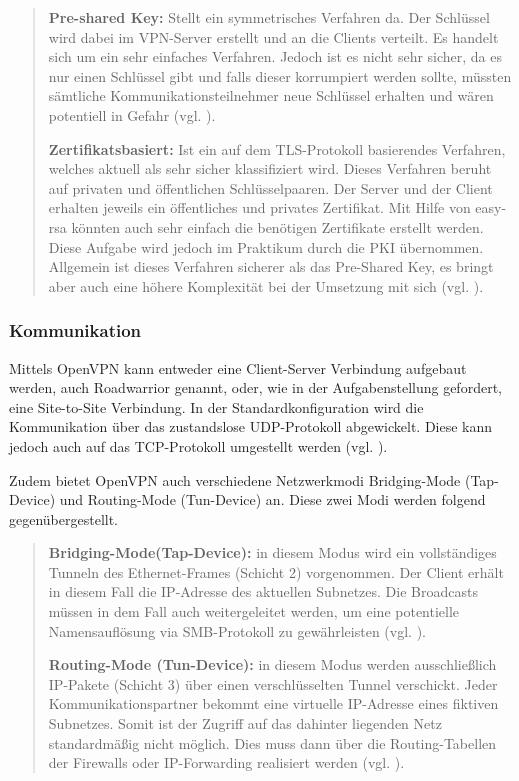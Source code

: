 \documentclass[
a4paper,     %
 headsepline, %
footsepline, %
titlepage,   %
 halfparskip,     %
 fleqn,       %
12pt         %
]{scrartcl}  %
\begin{document}
\begin{quotation}
\item[\textbf{Pre-shared Key:}]
Stellt ein symmetrisches Verfahren da. Der Schlüssel wird dabei im VPN-Server erstellt und an die Clients verteilt. Es handelt sich um ein sehr einfaches Verfahren. Jedoch ist es nicht sehr sicher, da es nur einen Schlüssel gibt und falls dieser korrumpiert werden sollte, müssten sämtliche Kommunikationsteilnehmer neue Schlüssel erhalten und wären potentiell in Gefahr (vgl. \cite{openV-1}). 

\item[\textbf{Zertifikatsbasiert:}]
Ist ein auf dem TLS-Protokoll basierendes Verfahren, welches aktuell als sehr sicher klassifiziert wird. Dieses Verfahren beruht auf privaten und öffentlichen Schlüsselpaaren. Der Server und der Client erhalten jeweils ein öffentliches und privates Zertifikat. Mit Hilfe von easy-rsa könnten auch sehr einfach die benötigen Zertifikate erstellt werden. Diese Aufgabe wird jedoch im Praktikum durch die PKI übernommen. Allgemein ist dieses Verfahren sicherer als das Pre-Shared Key, es bringt aber auch eine höhere Komplexität bei der Umsetzung mit sich (vgl. \cite{openV-1}). 
\end{quotation} 

\subsubsection{Kommunikation}

Mittels OpenVPN kann entweder eine Client-Server Verbindung aufgebaut werden, auch Roadwarrior genannt, oder, wie in der Aufgabenstellung gefordert, eine Site-to-Site Verbindung. In der Standardkonfiguration wird die Kommunikation über das zustandslose UDP-Protokoll abgewickelt. Diese kann jedoch auch auf das TCP-Protokoll umgestellt werden (vgl. \cite{openV-1}). 

Zudem bietet OpenVPN auch verschiedene Netzwerkmodi Bridging-Mode (Tap-Device) und Routing-Mode (Tun-Device) an. 
Diese zwei Modi werden folgend gegenübergestellt. 

\begin{quotation}
\item[\textbf{Bridging-Mode(Tap-Device):}]
in diesem Modus wird ein vollständiges Tunneln des Ethernet-Frames (Schicht 2) vorgenommen. Der Client erhält in diesem Fall die IP-Adresse des aktuellen Subnetzes. Die Broadcasts müssen in dem Fall auch weitergeleitet werden, um eine potentielle Namensauflösung via SMB-Protokoll zu gewährleisten (vgl. \cite{openV-1}).

\item[\textbf{Routing-Mode (Tun-Device):}]
in diesem Modus werden ausschließlich IP-Pakete (Schicht 3) über einen verschlüsselten Tunnel verschickt. Jeder Kommunikationspartner bekommt eine virtuelle IP-Adresse eines fiktiven Subnetzes. Somit ist der Zugriff auf das dahinter liegenden Netz standardmäßig nicht möglich. Dies muss dann über die Routing-Tabellen der Firewalls  oder IP-Forwarding realisiert werden (vgl. \cite{openV-1}).
\end{quotation}
\end{document}
